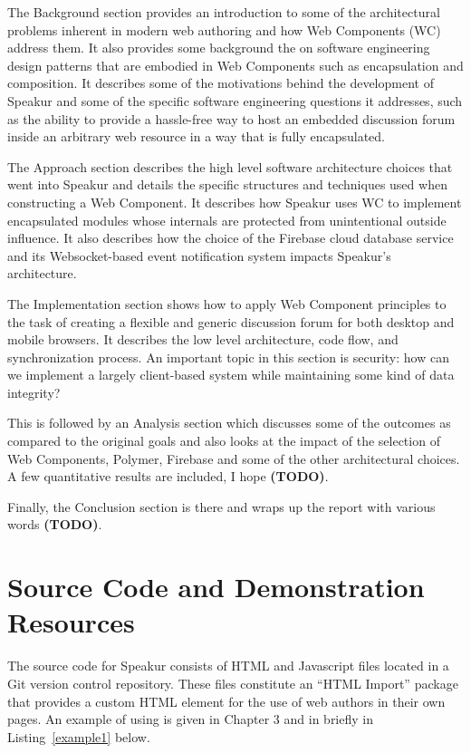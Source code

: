 The Background section provides an introduction to some of the architectural problems inherent in modern web authoring and how Web Components (WC) address them. 
It also provides some background the on software engineering design patterns that are embodied in Web Components such as encapsulation and composition.
It describes some of the motivations behind the development of Speakur and some of the specific software engineering questions it addresses, such as the ability to provide a hassle-free way to host an embedded discussion forum inside an arbitrary web resource in a way that is fully encapsulated.

The Approach section describes the high level software architecture choices that went into Speakur and details the specific structures and techniques used when constructing a Web Component.
It describes how Speakur uses WC to implement encapsulated modules whose internals are protected from unintentional outside influence. 
It also describes how the choice of the Firebase cloud database service and its Websocket-based event notification system impacts Speakur's architecture.

The Implementation section shows how to apply Web Component principles to the task of creating a flexible and generic discussion forum for both desktop and mobile browsers. 
It describes the low level architecture, code flow, and synchronization process.
An important topic in this section is security: how can we implement a largely client-based system while maintaining some kind of data integrity?

This is followed by an Analysis section which discusses some of the outcomes as compared to the original goals and also looks at the impact of the selection of Web Components, Polymer, Firebase and some of the other architectural choices. 
A few quantitative results are included, I hope \textbf{(TODO)}.

Finally, the Conclusion section is there and wraps up the report with various words \textbf{(TODO)}. 

\section{Source Code and Demonstration Resources}
%

The source code for Speakur consists of HTML and Javascript files located in a Git version control repository. 
These files constitute an ``HTML Import'' package that provides a
\textbf{}
custom HTML element for the use of web authors in their own pages.
An example of using  is given in Chapter 3 and in briefly in Listing~\ref{example1} below.

